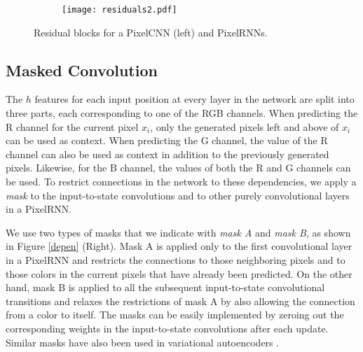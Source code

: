 \documentclass{article}
\begin{document}
\begin{figure}[ht]
\centering
\begin{subfigure}{.4\textwidth}
  \centering
  \texttt{[image: residuals2.pdf]}
\end{subfigure}\caption{Residual blocks for a PixelCNN (left) and PixelRNNs.}
\label{fig:residual_blocks}
\vspace{-0.2cm}
\end{figure}

\subsection{Masked Convolution}
\label{sect:masked}

The $h$ features for each input position at every layer in the network are split into three parts, each corresponding to one of the RGB channels. When predicting the R channel for the current pixel $x_i$, only the generated pixels left and above of $x_i$ can be used as context. When predicting the G channel, the value of the R channel can also be used as context in addition to the previously generated pixels. Likewise, for the B channel, the values of both the R and G channels can be used. To restrict connections in the network to these dependencies, we apply a \emph{mask} to the input-to-state convolutions and to other purely convolutional layers in a PixelRNN. 

We use two types of masks that we indicate with \emph{mask A} and \emph{mask B}, as shown in Figure \ref{depen} (Right). Mask A is applied only to the first convolutional layer in a PixelRNN and restricts the connections to those neighboring pixels and to those colors in the current pixels that have already been predicted. On the other hand, mask B is applied to all the subsequent input-to-state convolutional transitions and relaxes the restrictions of mask A by also allowing the connection from a color to itself. The masks can be easily implemented by zeroing out the corresponding weights in the input-to-state convolutions after each update. Similar masks have also been used in variational autoencoders \cite{gregor2013deep, germain2015made}.
\end{document}
